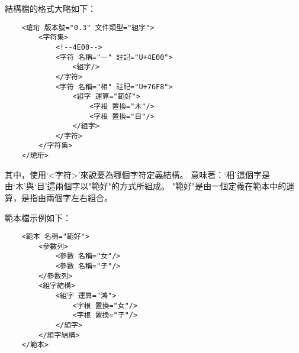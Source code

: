 結構檔的格式大略如下：
\listXML\begin{lstlisting}
	<瑲珩 版本號="0.3" 文件類型="組字">
		<字符集>
			<!--4E00-->
			<字符 名稱="一" 註記="U+4E00">
				<組字/>
			</字符>
			<字符 名稱="相" 註記="U+76F8">
				<組字 運算="範好">
					<字根 置換="木"/>
					<字根 置換="目"/>
				</組字>
			</字符>
		</字符集>
	</瑲珩>
\end{lstlisting}

其中，使用`<字符>'來說要為哪個字符定義結構。
意味著：`相'這個字是由`木'與`目'這兩個字以"範好"的方式所組成。
"範好"是由一個定義在範本中的運算，是指由兩個字左右組合。

範本檔示例如下：
\listXML\begin{lstlisting}
	<範本 名稱="範好">
		<參數列>
			<參數 名稱="女"/>
			<參數 名稱="子"/>
		</參數列>
		<組字結構>
			<組字 運算="鴻">
				<字根 置換="女"/>
				<字根 置換="子"/>
			</組字>
		</組字結構>
	</範本>
\end{lstlisting}



